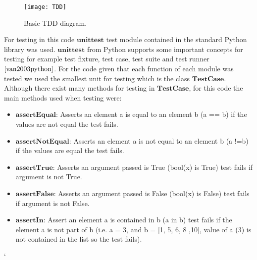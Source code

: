 \documentclass{book}
\begin{document}
\begin{figure}[h]
\begin{center}
	\texttt{[image: TDD]}

\caption{Basic TDD diagram.}
\label{tab:tdddiag}
\end{center}
\end{figure}

For testing in this code $\textbf{unittest}$ test module contained in the standard Python library was used. $\textbf{unittest}$ from Python supports some important concepts for testing for example test fixture, test case, test suite and test runner $\cite{van2003python}$. For the code given that each function of each module was tested we used the smallest unit for testing which is the class $\textbf{TestCase}$. Although there exist many methods for testing in $\textbf{TestCase}$,  for this code the main methods used when testing were:

\begin{itemize}
	\item $\textbf{assertEqual:}$ Asserts an element a is equal to an element  b (a == b) if the values are not equal the test fails.
	\item $\textbf{assertNotEqual:}$ Asserts an element a is not equal to an element b (a !=b) if the values are equal the test fails.
	\item $\textbf{assertTrue:}$ Asserts an argument passed is True (bool(x) is True) test fails if argument is not True. 
	\item $\textbf{assertFalse:}$ Asserts an argument passed is False (bool(x) is False) test fails if argument is not False.
	\item $\textbf{assertIn:}$ Assert an element a is contained in b (a in b) test fails if the element a is not part of b (i.e. a = 3, and b = [1, 5, 6, 8 ,10], value of a (3) is not contained in the list so the test fails).
\end{itemize}

`
\end{document}
